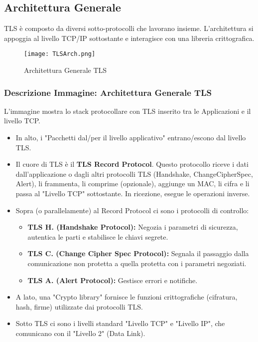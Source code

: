 \documentclass[../main.tex]{subfiles}
\begin{document}
\subsection{Architettura Generale}
TLS è composto da diversi sotto-protocolli che lavorano insieme. L'architettura si appoggia al livello TCP/IP sottostante e interagisce con una libreria crittografica.

\begin{figure}[H]
  \centering
  \texttt{[image: TLSArch.png]}
  \caption{Architettura Generale TLS}
  \label{fig:TLSArch}
\end{figure}

\subsubsection*{Descrizione Immagine: Architettura Generale TLS}
L'immagine mostra lo stack protocollare con TLS inserito tra le Applicazioni e il livello TCP.
\begin{itemize}
    \item In alto, i "Pacchetti dal/per il livello applicativo" entrano/escono dal livello TLS.
    \item Il cuore di TLS è il \textbf{TLS Record Protocol}. Questo protocollo riceve i dati dall'applicazione o dagli altri protocolli TLS (Handshake, ChangeCipherSpec, Alert), li frammenta, li comprime (opzionale), aggiunge un MAC, li cifra e li passa al "Livello TCP" sottostante. In ricezione, esegue le operazioni inverse.
    \item Sopra (o parallelamente) al Record Protocol ci sono i protocolli di controllo:
        \begin{itemize}
            \item \textbf{TLS H. (Handshake Protocol):} Negozia i parametri di sicurezza, autentica le parti e stabilisce le chiavi segrete.
            \item \textbf{TLS C. (Change Cipher Spec Protocol):} Segnala il passaggio dalla comunicazione non protetta a quella protetta con i parametri negoziati.
            \item \textbf{TLS A. (Alert Protocol):} Gestisce errori e notifiche.
        \end{itemize}
    \item A lato, una "Crypto library" fornisce le funzioni crittografiche (cifratura, hash, firme) utilizzate dai protocolli TLS.
    \item Sotto TLS ci sono i livelli standard "Livello TCP" e "Livello IP", che comunicano con il "Livello 2" (Data Link).
\end{itemize}
\end{document}
